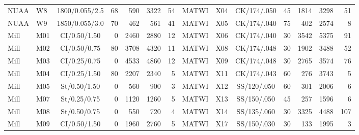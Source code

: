 \begin{table}[!tbp]
\begin{tabular}{llcrrrr@{\hspace{10pt}}llcrrrr}
NUAA & W8 & 1800/0.055/2.5 & 68 & 590 & 3322 & 54 & MATWI & X04 & CK/174/.050 & 45 & 1814 & 3298 & 51\\
NUAA & W9 & 1850/0.055/3.0 & 70 & 462 & 561 & 41 & MATWI & X05 & CK/174/.040 & 75 & 402 & 2574 & 8\\
Mill & M01 & CI/0.50/1.50 & 0 & 2460 & 2880 & 12 & MATWI & X06 & CK/174/.040 & 30 & 3542 & 5375 & 91\\
Mill & M02 & CI/0.50/0.75 & 80 & 3708 & 4320 & 11 & MATWI & X08 & CK/174/.048 & 30 & 1902 & 3488 & 52\\
Mill & M03 & CI/0.25/0.75 & 0 & 4533 & 4860 & 12 & MATWI & X09 & CK/174/.048 & 30 & 2765 & 3574 & 76\\
Mill & M04 & CI/0.25/1.50 & 80 & 2207 & 2340 & 5 & MATWI & X11 & CK/174/.043 & 60 & 276 & 3743 & 5\\
Mill & M05 & St/0.50/1.50 & 0 & 560 & 900 & 3 & MATWI & X12 & SS/120/.050 & 60 & 301 & 2006 & 6\\
Mill & M07 & St/0.25/0.75 & 0 & 1120 & 1260 & 5 & MATWI & X13 & SS/150/.050 & 45 & 257 & 1596 & 6\\
Mill & M08 & St/0.50/0.75 & 0 & 550 & 720 & 4 & MATWI & X14 & SS/135/.060 & 30 & 3325 & 4488 & 107\\
Mill & M09 & CI/0.50/1.50 & 0 & 1960 & 2760 & 5 & MATWI & X17 & SS/150/.030 & 30 & 133 & 1995 & 3\\
\bottomrule
\end{tabular}
\end{table}
